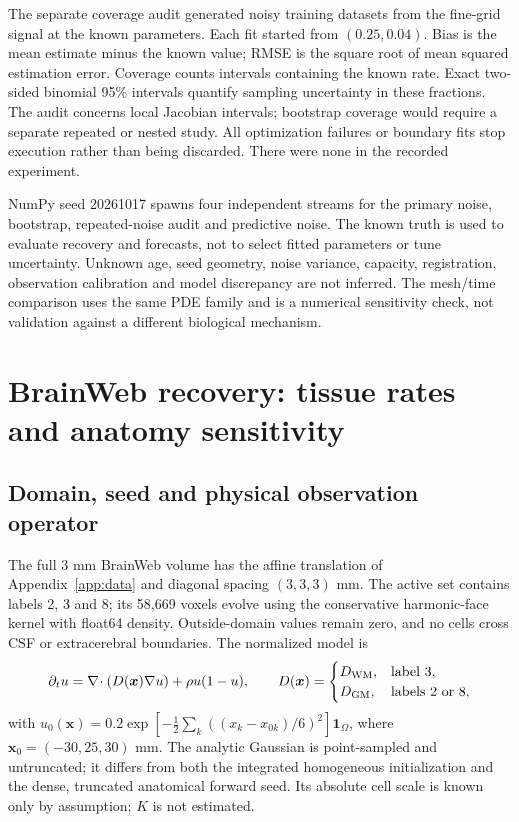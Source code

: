 The separate coverage audit generated \RecoveryTrials{} noisy training datasets from the fine-grid signal at the known parameters. Each fit started from $(0.25,0.04)$. Bias is the mean estimate minus the known value; RMSE is the square root of mean squared estimation error. Coverage counts intervals containing the known rate. Exact two-sided binomial 95\% intervals quantify sampling uncertainty in these fractions. The audit concerns local Jacobian intervals; bootstrap coverage would require a separate repeated or nested study. All optimization failures or boundary fits stop execution rather than being discarded. There were none in the recorded experiment.

NumPy seed 20261017 spawns four independent streams for the primary noise, bootstrap, repeated-noise audit and predictive noise. The known truth is used to evaluate recovery and forecasts, not to select fitted parameters or tune uncertainty. Unknown age, seed geometry, noise variance, capacity, registration, observation calibration and model discrepancy are not inferred. The mesh/time comparison uses the same PDE family and is a numerical sensitivity check, not validation against a different biological mechanism.


\section{BrainWeb recovery: tissue rates and anatomy sensitivity}\label{app:bw_recovery}
\subsection{Domain, seed and physical observation operator}
The full 3 mm BrainWeb volume has the affine translation of Appendix~\ref{app:data} and diagonal spacing $(3,3,3)$ mm. The active set contains labels 2, 3 and 8; its 58,669 voxels evolve using the conservative harmonic-face kernel with float64 density. Outside-domain values remain zero, and no cells cross CSF or extracerebral boundaries. The normalized model is
\begin{equation}
 \partial_t u=\nabla\!\cdot(D(\bm x)\nabla u)+\rho u(1-u),\qquad
 D(\bm x)=\begin{cases}D_{\rm WM},&\text{label 3},\\D_{\rm GM},&\text{labels 2 or 8},\end{cases}
\end{equation}
with $u_0(\bm x)=0.2\exp[-\frac12\sum_k((x_k-x_{0k})/6)^2]\mathbf 1_\Omega$, where $\bm x_0=(-30,25,30)$ mm. The analytic Gaussian is point-sampled and untruncated; it differs from both the integrated homogeneous initialization and the dense, truncated anatomical forward seed. Its absolute cell scale is known only by assumption; $K$ is not estimated.

